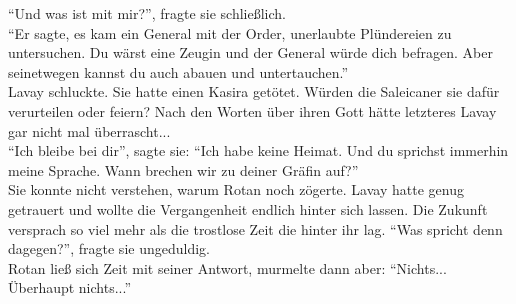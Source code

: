 ``Und was ist mit mir?'', fragte sie schließlich.\\
``Er sagte, es kam ein General mit der Order, unerlaubte Plündereien zu untersuchen. Du wärst eine 
Zeugin und der General würde dich befragen. Aber seinetwegen kannst du auch abauen und 
untertauchen.''\\
Lavay schluckte. Sie hatte einen Kasira getötet. Würden die Saleicaner sie dafür verurteilen oder 
feiern? Nach den Worten über ihren Gott hätte letzteres Lavay gar nicht mal überrascht...\\
``Ich bleibe bei dir'', sagte sie: ``Ich habe keine Heimat. Und du sprichst immerhin meine 
Sprache. Wann brechen wir zu deiner Gräfin auf?''\\
Sie konnte nicht verstehen, warum Rotan noch zögerte. Lavay hatte genug getrauert und wollte die 
Vergangenheit endlich hinter sich lassen. Die Zukunft versprach so viel mehr als die trostlose Zeit 
die hinter ihr lag. ``Was spricht denn dagegen?'', fragte sie ungeduldig.\\
Rotan ließ sich Zeit mit seiner Antwort, murmelte dann aber: ``Nichts... Überhaupt nichts...''\\


